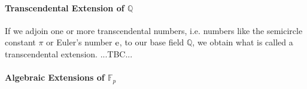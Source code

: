 


\paragraph{Transcendental Extension of $\mathbb{Q}$}
If we adjoin one or more transcendental numbers, i.e. numbers like the semicircle constant $\pi$ or Euler's number $\operatorname{\mathrm{e}}$, to our base field $\mathbb{Q}$, we obtain what is called a transcendental extension. ...TBC...



\paragraph{Algebraic Extensions of $\mathbb{F}_p$}




